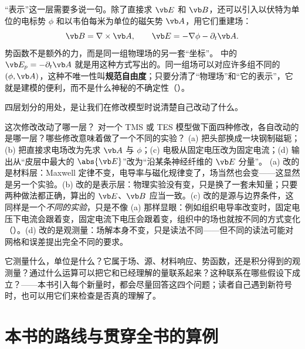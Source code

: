 
“表示”这一层需要多说一句。除了直接求 $\vb E$ 和 $\vb B$，还可以引入以伏特为单位的电标势 $\phi$ 和以韦伯每米为单位的磁矢势 $\vb A$，用它们重建场：
\begin{equation}
\vb B=\nabla\times\vb A,\qquad \vb E=-\nabla\phi-\partial_t\vb A .
\label{eq:intro-potentials}
\end{equation}
势函数不是额外的力，而是同一组物理场的另一套“坐标”。 中的 $\vb E_p=-\partial_t\vb A$ 就是用这种方式写出的。同一组场可以对应许多组不同的 $(\phi,\vb A)$，这种不唯一性叫\textbf{规范自由度}；只要分清了“物理场”和“它的表示”，它就是建模的便利，而不是什么神秘的不确定性（）。

四层划分的用处，是让我们在修改模型时说清楚自己改动了什么。

\begin{example}{这次修改改动了哪一层？}\label{ex:intro-layers}
对一个 TMS 或 TES 模型做下面四种修改，各自改动的是哪一层？哪些修改意味着做了一个不同的实验？
(a) 把头部换成一块钢制磁轭；(b) 把直接求电场改为先求 $\vb A$ 与 $\phi$；(c) 电极从固定电压改为固定电流；(d) 输出从“皮层中最大的 $\abs{\vb E}$”改为“沿某条神经纤维的 $\vb E$ 分量”。
\solution
(a) 改的是材料层：Maxwell 定律不变，电导率与磁化规律变了，场当然也会变——这显然是另一个实验。(b) 改的是表示层：物理实验没有变，只是换了一套未知量；只要两种做法都正确，算出的 $\vb E$、$\vb B$ 应当一致。(c) 改的是源与边界条件，这同样是一个\emph{不同的实验}，只是不像 (a) 那样显眼：例如组织电导率改变时，固定电压下电流会跟着变，固定电流下电压会跟着变，组织中的场也就按不同的方式变化（）。(d) 改的是观测量：场解本身不变，只是读法不同——但不同的读法可能对网格和误差提出完全不同的要求。
\end{example}

\begin{intuition}
它测量什么，单位是什么？它属于场、源、材料响应、势函数，还是积分得到的观测量？通过什么运算可以把它和已经理解的量联系起来？这种联系在哪些假设下成立？——本书引入每个新量时，都会尽量回答这四个问题；读者自己遇到新符号时，也可以用它们来检查是否真的理解了。
\end{intuition}

\section{本书的路线与贯穿全书的算例}\label{sec:intro-route}

